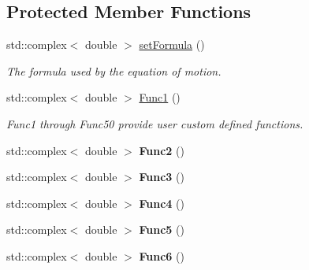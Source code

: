 \subsection*{Protected Member Functions}
\begin{DoxyCompactItemize}
\item 
std\-::complex$<$ double $>$ \hyperlink{classosea_1_1ofreq_1_1_eqn_translation_af2681a6f73df8e8518d81eba5ac9152e}{set\-Formula} ()
\begin{DoxyCompactList}\small\item\em The formula used by the equation of motion. \end{DoxyCompactList}\item 
std\-::complex$<$ double $>$ \hyperlink{classosea_1_1ofreq_1_1_eqn_translation_a147be15e86663c1af76ca2ecaeece82d}{Func1} ()
\begin{DoxyCompactList}\small\item\em Func1 through Func50 provide user custom defined functions. \end{DoxyCompactList}\item 
\hypertarget{classosea_1_1ofreq_1_1_eqn_translation_ac2bdafda8b9be19c5b7432a4bd47dcf0}{std\-::complex$<$ double $>$ {\bfseries Func2} ()}\label{classosea_1_1ofreq_1_1_eqn_translation_ac2bdafda8b9be19c5b7432a4bd47dcf0}

\item 
\hypertarget{classosea_1_1ofreq_1_1_eqn_translation_acf2fcd62e136144499258d4ec5bfb6f5}{std\-::complex$<$ double $>$ {\bfseries Func3} ()}\label{classosea_1_1ofreq_1_1_eqn_translation_acf2fcd62e136144499258d4ec5bfb6f5}

\item 
\hypertarget{classosea_1_1ofreq_1_1_eqn_translation_a1db00d610095489d2a06d69692a0dc48}{std\-::complex$<$ double $>$ {\bfseries Func4} ()}\label{classosea_1_1ofreq_1_1_eqn_translation_a1db00d610095489d2a06d69692a0dc48}

\item 
\hypertarget{classosea_1_1ofreq_1_1_eqn_translation_a37eb73b4fed858ff008c0ba4d333b1f8}{std\-::complex$<$ double $>$ {\bfseries Func5} ()}\label{classosea_1_1ofreq_1_1_eqn_translation_a37eb73b4fed858ff008c0ba4d333b1f8}

\item 
\hypertarget{classosea_1_1ofreq_1_1_eqn_translation_aa094532bc1384cabaf532573e8ab3db7}{std\-::complex$<$ double $>$ {\bfseries Func6} ()}\label{classosea_1_1ofreq_1_1_eqn_translation_aa094532bc1384cabaf532573e8ab3db7}


\end{DoxyCompactItemize}
